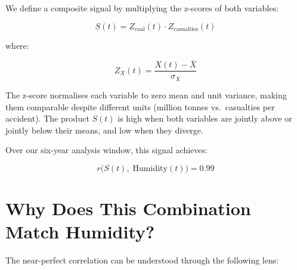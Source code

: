 \documentclass[12pt,a4paper]{article}
\begin{document}
We define a composite signal by multiplying the z-scores of both variables:

\begin{equation}
S(t) = Z_{\text{coal}}(t) \cdot Z_{\text{casualties}}(t)
\end{equation}

where:

\begin{equation}
Z_X(t) = \frac{X(t) - \bar{X}}{\sigma_X}
\end{equation}

The z-score normalises each variable to zero mean and unit variance, making them comparable despite different units (million tonnes vs.\ casualties per accident). The product $S(t)$ is high when both variables are jointly above or jointly below their means, and low when they diverge.

Over our six-year analysis window, this signal achieves:

\begin{equation}
r\big(S(t),\; \text{Humidity}(t)\big) = 0.99
\end{equation}


\section{Why Does This Combination Match Humidity?}

The near-perfect correlation can be understood through the following lens:
\end{document}
